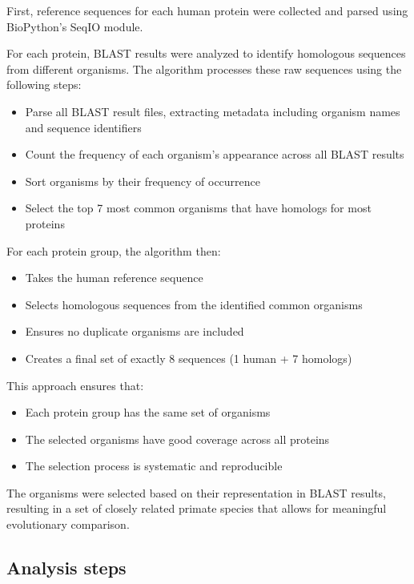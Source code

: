 \documentclass[11pt, a4paper, hidelinks]{article}
\begin{document}
\noindent First, reference sequences for each human protein were collected and parsed using BioPython's SeqIO module.

\noindent For each protein, BLAST results were analyzed to identify homologous sequences from different organisms. The algorithm processes these raw sequences using the following steps:

\begin{itemize}
    \item Parse all BLAST result files, extracting metadata including organism names and sequence identifiers
    \item Count the frequency of each organism's appearance across all BLAST results
    \item Sort organisms by their frequency of occurrence
    \item Select the top 7 most common organisms that have homologs for most proteins
\end{itemize}

\noindent For each protein group, the algorithm then:
\begin{itemize}
    \item Takes the human reference sequence
    \item Selects homologous sequences from the identified common organisms
    \item Ensures no duplicate organisms are included
    \item Creates a final set of exactly 8 sequences (1 human + 7 homologs)
\end{itemize}

\noindent This approach ensures that:
\begin{itemize}
    \item Each protein group has the same set of organisms
    \item The selected organisms have good coverage across all proteins
    \item The selection process is systematic and reproducible
\end{itemize}

\noindent The organisms were selected based on their representation in BLAST results, resulting in a set of closely related primate species that allows for meaningful evolutionary comparison.

\subsection{Analysis steps}\label{subsec:analysis-steps}
\end{document}
